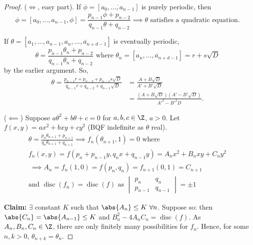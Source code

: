\documentclass{article}
\DeclareMathOperator{\disc}{disc}
\begin{document}
\begin{proof}
    ($\iff$, easy part). If $\phi = [\overline{a_0, \dotsc, a_{n-1}}]$ is purely periodic, then
    \begin{equation*}
        \phi = [a_0, \dotsc, a_{n-1}, \phi] = \frac{p_{n-1} \phi + p_{n-2}}{q_{n-1} \theta + q_{n-2}} \implies \theta \text{ satisfies a quadratic equation}.
    \end{equation*}

    If $\theta = [a_1, \dotsc, a_{n-1}, \overline{a_n, \dotsc, a_{n+d-1}}]$ is eventually periodic,
    \begin{equation*}
        \theta = \frac{p_{n-1} \theta_n + p_{n-2}}{q_{n-1} \theta_n + q_{n-2}} \text{ where } \theta_n = [\overline{a_n, \dotsc, a_{n+d-1}}] = r + s \sqrt{D}
    \end{equation*}
    by the earlier argument.
    So,
    \begin{align*}
        \theta = \frac{p_{n-1} r + p_{n-2} + p_{n-1} s \sqrt{D}}{q_{n-1} r + q_{n-2} + q_{n-1} \sqrt{D}} &= \frac{A + B \sqrt{D}}{A' + B' \sqrt{D}} \\
                                                                                                         &= \frac{(A + B \sqrt{D})(A' - B' \sqrt{D})}{A'^2 - B'^2 D}.
    \end{align*}

    ($\impliedby$) Suppose $a \theta^2 + b \theta + c= 0$ for $a, b, c \in \Z$, $a > 0$.
    Let $f(x, y) = a x^2 + b x y + c y^2$ (BQF indefinite as $\theta$ real).
    \begin{gather*}
        \theta = \frac{p_n \theta_{n+1} + p_{n+1}}{q_n \theta_{n+1} + q_{n+1}} \implies f_n(\theta_{n+1}, 1) = 0 \text{ where} \\
        f_n(x, y) = f(p_n + p_{n-1} y, q_n x + q_{n-1} y) = A_n x^2 + B_n x y + C_n y^2 \\\
        \implies A_n = f_n(1, 0) = f(p_n, q_n) = f_{n+1}(0, 1) = C_{n+1} \\
        \text{and } \disc(f_n) = \disc(f) \text{ as } \begin{vmatrix} p_n & q_n \\ p_{n-1} & q_{n-1} \end{vmatrix} = \pm 1
    \end{gather*}

    \textbf{Claim:} $\exists$ constant $K$ such that $\abs{A_n} \leq K \ \forall n$.
    Suppose so: then $\abs{C_n} = \abs{A_{n-1}} \leq K$ and $B_n^2 - 4 A_n C_n = \disc(f)$.
    As $A_n, B_n, C_n \in \Z$, there are only finitely many possibilities for $f_n$. Hence, for some $n, k > 0$, $\theta_{n+k} = \theta_n$.


\end{proof}
\end{document}
